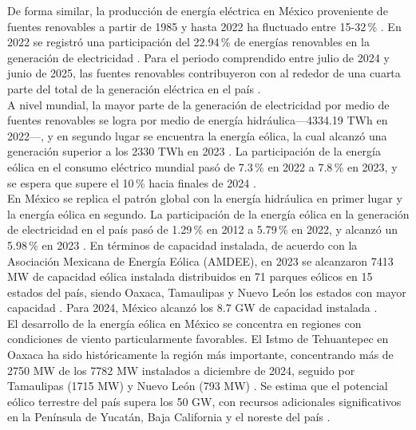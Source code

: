De forma similar, la producción de energía eléctrica en México proveniente 
de fuentes renovables a partir de 1985 y hasta 2022 ha fluctuado entre 
15-32\,\% \cite{EnergyInstitute2023}. En 2022 se registró una participación 
del 22.94\,\% de energías renovables en la generación de electricidad 
\cite{Ritchie2020}. Para el periodo comprendido entre julio de 2024 y 
junio de 2025, las fuentes renovables contribuyeron con al rededor de una 
cuarta parte del total de la generación eléctrica en el país 
\cite{LowCarbonPower2025}.
\\

A nivel mundial, la mayor parte de la generación de electricidad por medio 
de fuentes renovables se logra por medio de energía hidráulica---4334.19 
TWh en 2022---, y en segundo lugar se encuentra la energía 
eólica, la cual alcanzó una generación superior a los 2330 TWh en 2023 
\cite{IEA2024wind}. La participación de la energía eólica en el consumo 
eléctrico mundial pasó de 7.3\,\% en 2022 a 7.8\,\% en 2023, y se espera 
que supere el 10\,\% hacia finales de 2024 \cite{WWEA2024}.
\\

En México se replica el patrón global con la energía hidráulica en primer 
lugar y la energía eólica en segundo. La participación de la energía eólica 
en la generación de electricidad en el país pasó de 1.29\,\% en 2012 a 
5.79\,\% en 2022, y alcanzó un 5.98\,\% en 2023 \cite{EnergyInstitute2023, 
AMDEE2024}. En términos de capacidad instalada, de acuerdo con la 
Asociación Mexicana de Energía Eólica (AMDEE), en 2023 se alcanzaron 
7413 MW de capacidad eólica instalada distribuidos en 71 parques eólicos 
en 15 estados del país, siendo Oaxaca, Tamaulipas y Nuevo León los estados 
con mayor capacidad \cite{AMDEE2024}. Para 2024, México alcanzó los 8.7 GW 
de capacidad instalada \cite{WWEA2024}.
\\

El desarrollo de la energía eólica en México se concentra en regiones con 
condiciones de viento particularmente favorables. El Istmo de Tehuantepec 
en Oaxaca ha sido históricamente la región más importante, concentrando 
más de 2750 MW de los 7782 MW instalados a diciembre de 2024, seguido por 
Tamaulipas (1715 MW) y Nuevo León (793 MW) \cite{AMDEE2024report}. Se 
estima que el potencial eólico terrestre del país supera los 50 GW, con 
recursos adicionales significativos en la Península de Yucatán, Baja 
California y el noreste del país \cite{AMDEE2024report}. 
\\

